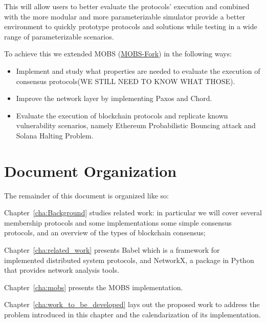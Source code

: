 This will allow users to better evaluate the protocols' execution and combined with the more modular and more
parameterizable simulator provide a better environment to quickly prototype protocols and solutions while testing in
a wide range of parameterizable scenarios.

To achieve this we extended MOBS (\href{https://github.com/RMLoureiro/MOBS}{MOBS-Fork}) in the following ways:
\begin{itemize}
  \item Implement and study what properties are needed to evaluate the execution of consensus protocols(WE STILL NEED TO KNOW WHAT THOSE).
  \item Improve the network layer by implementing Paxos and Chord.
  \item Evaluate the execution of blockchain protocols and replicate known
    vulnerability scenarios, namely Ethereum Probabilistic Bouncing attack\cite{ethereum_analysis} and 
    Solana Halting Problem\cite{solana_halting_problem}.
\end{itemize}
\section{Document Organization}\label{sub:document_organization}

The remainder of this document is organized like so:

Chapter~\ref{cha:Background} studies related work: in particular we will cover several membership protocols and some implementations
some simple consensus protocols, and an overview of the types of blockchain consensus;


Chapter~\ref{cha:related_work} presents Babel which is a framework for implemented distributed system protocols, and NetworkX,
a package in Python that provides network analysis tools.

Chapter~\ref{cha:mobs} presents the MOBS implementation.

Chapter~\ref{cha:work_to_be_developed} lays out the proposed work to address the problem
introduced in this chapter and the calendarization of its implementation.
